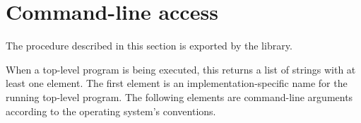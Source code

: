 \section{Command-line access}
\label{programlibsection}

The procedure described in this section is exported by the
 library.

\begin{entry}{%
}

When a top-level program is being executed, this returns a list of strings with
at least one element.  The first element is an implementation-specific
name for the running top-level program.  The following elements are command-line
arguments according to the operating system's conventions.
\end{entry}

